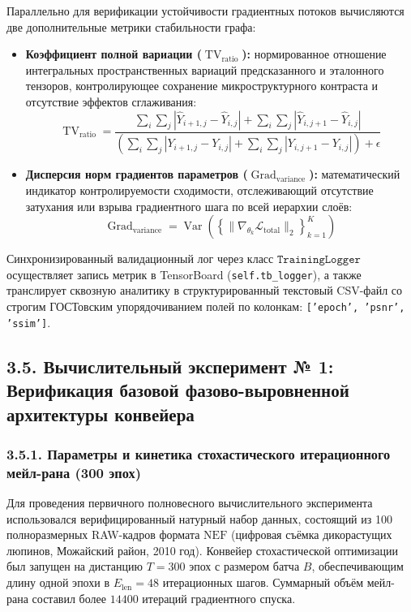 \documentclass[12pt,a4paper]{article}
\begin{document}
Параллельно для верификации устойчивости градиентных потоков вычисляются две дополнительные метрики стабильности графа:
\begin{itemize}
    \item \textbf{Коэффициент полной вариации ($\operatorname{TV}_{\operatorname{ratio}}$):} нормированное отношение интегральных пространственных вариаций предсказанного и эталонного тензоров, контролирующее сохранение микроструктурного контраста и отсутствие эффектов сглаживания:
    \begin{equation}
    \operatorname{TV}_{\operatorname{ratio}} = \frac{\sum_{i} \sum_{j} |\hat{Y}_{i+1,j} - \hat{Y}_{i,j}| + \sum_{i} \sum_{j} |\hat{Y}_{i,j+1} - \hat{Y}_{i,j}|}{\left(\sum_{i} \sum_{j} |Y_{i+1,j} - Y_{i,j}| + \sum_{i} \sum_{j} |Y_{i,j+1} - Y_{i,j}|\right) + \epsilon}
    \end{equation}
    \item \textbf{Дисперсия норм градиентов параметров ($\operatorname{Grad}_{\operatorname{variance}}$):} математический индикатор контролируемости сходимости, отслеживающий отсутствие затухания или взрыва градиентного шага по всей иерархии слоёв:
    \begin{equation}
    \operatorname{Grad}_{\operatorname{variance}} = \operatorname{Var}\left( \left\{ \|\nabla_{\theta_k} \mathcal{L}_{\operatorname{total}}\|_2 \right\}_{k=1}^{K} \right)
    \end{equation}
\end{itemize}
Синхронизированный валидационный лог через класс $\texttt{TrainingLogger}$ осуществляет запись метрик в TensorBoard (\texttt{self.tb\_logger}), а также транслирует сквозную аналитику в структурированный текстовый CSV-файл со строгим ГОСТовским упорядочиванием полей по колонкам: \texttt{['epoch', 'psnr', 'ssim']}.

\subsection{3.5. Вычислительный эксперимент № 1: Верификация базовой фазово-выровненной архитектуры конвейера}

\subsubsection{3.5.1. Параметры и кинетика стохастического итерационного мейл-рана (300 эпох)}

Для проведения первичного полновесного вычислительного эксперимента использовался верифицированный натурный набор данных, состоящий из 100 полноразмерных RAW-кадров формата $\text{NEF}$ (цифровая съёмка дикорастущих люпинов, Можайский район, 2010 год). Конвейер стохастической оптимизации был запущен на дистанцию $T = 300$ эпох с размером батча $B$, обеспечивающим длину одной эпохи в $E_{\operatorname{len}} = 48$ итерационных шагов. Суммарный объём мейл-рана составил более $14400$ итераций градиентного спуска. 
\end{document}
